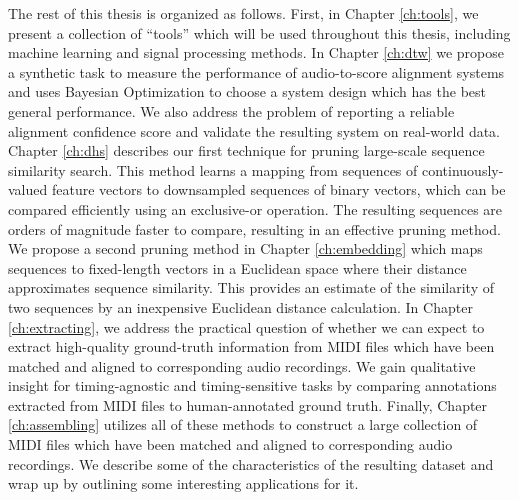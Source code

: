 The rest of this thesis is organized as follows.
First, in Chapter \ref{ch:tools}, we present a collection of ``tools'' which will be used throughout this thesis, including machine learning and signal processing methods.
In Chapter \ref{ch:dtw} we propose a synthetic task to measure the performance of audio-to-score alignment systems and uses Bayesian Optimization to choose a system design which has the best general performance.
We also address the problem of reporting a reliable alignment confidence score and validate the resulting system on real-world data.
Chapter \ref{ch:dhs} describes our first technique for pruning large-scale sequence similarity search.
This method learns a mapping from sequences of continuously-valued feature vectors to downsampled sequences of binary vectors, which can be compared efficiently using an exclusive-or operation.
The resulting sequences are orders of magnitude faster to compare, resulting in an effective pruning method.
We propose a second pruning method in Chapter \ref{ch:embedding} which maps sequences to fixed-length vectors in a Euclidean space where their distance approximates sequence similarity.
This provides an estimate of the similarity of two sequences by an inexpensive Euclidean distance calculation.
In Chapter \ref{ch:extracting}, we address the practical question of whether we can expect to extract high-quality ground-truth information from MIDI files which have been matched and aligned to corresponding audio recordings.
We gain qualitative insight for timing-agnostic and timing-sensitive tasks by comparing annotations extracted from MIDI files to human-annotated ground truth.
Finally, Chapter \ref{ch:assembling} utilizes all of these methods to construct a large collection of MIDI files which have been matched and aligned to corresponding audio recordings.
We describe some of the characteristics of the resulting dataset and wrap up by outlining some interesting applications for it.
